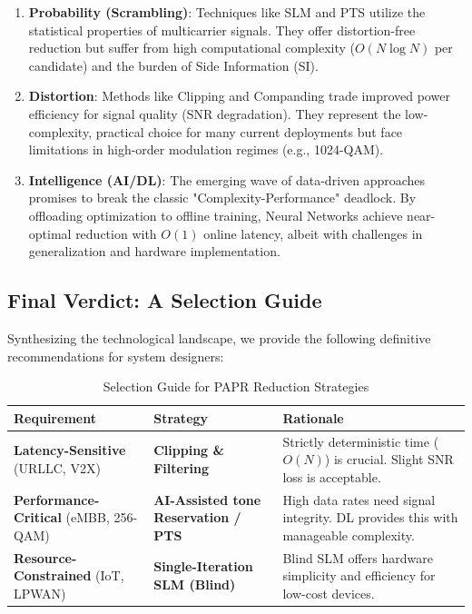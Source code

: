 \documentclass[journal]{IEEEtran}
\begin{document}
\begin{enumerate}
    \item \textbf{Probability (Scrambling)}: Techniques like SLM and PTS utilize the statistical properties of multicarrier signals. They offer distortion-free reduction but suffer from high computational complexity ($O(N \log N)$ per candidate) and the burden of Side Information (SI).
    \item \textbf{Distortion}: Methods like Clipping and Companding trade improved power efficiency for signal quality (SNR degradation). They represent the low-complexity, practical choice for many current deployments but face limitations in high-order modulation regimes (e.g., 1024-QAM).
    \item \textbf{Intelligence (AI/DL)}: The emerging wave of data-driven approaches promises to break the classic "Complexity-Performance" deadlock. By offloading optimization to offline training, Neural Networks achieve near-optimal reduction with $O(1)$ online latency, albeit with challenges in generalization and hardware implementation.
\end{enumerate}

\subsection{Final Verdict: A Selection Guide}
Synthesizing the technological landscape, we provide the following definitive recommendations for system designers:

\begin{table}[htbp]
    \caption{Selection Guide for PAPR Reduction Strategies}
    \begin{center}
        \begin{tabular}{|p{3cm}|p{3cm}|p{4cm}|}
            \hline
            \textbf{Requirement}                          & \textbf{Strategy}                           & \textbf{Rationale}                                                                  \\ \hline
            \textbf{Latency-Sensitive} (URLLC, V2X)       & \textbf{Clipping \& Filtering}              & Strictly deterministic time ($O(N)$) is crucial. Slight SNR loss is acceptable.     \\ \hline
            \textbf{Performance-Critical} (eMBB, 256-QAM) & \textbf{AI-Assisted tone Reservation / PTS} & High data rates need signal integrity. DL provides this with manageable complexity. \\ \hline
            \textbf{Resource-Constrained} (IoT, LPWAN)    & \textbf{Single-Iteration SLM (Blind)}       & Blind SLM offers hardware simplicity and efficiency for low-cost devices.           \\ \hline
        \end{tabular}
        \label{tab3}
    \end{center}
\end{table}
\end{document}
